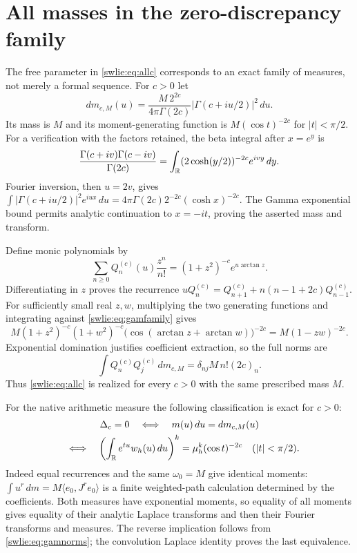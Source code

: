 \section{All masses in the zero-discrepancy family}

The free parameter in \eqref{swlie:eq:allc} corresponds to an exact
family of measures, not merely a formal sequence. For $c>0$ let
\begin{equation}\label{swlie:eq:gamfamily}
 dm_{c,M}(u)=
 \frac{M\,2^{2c}}{4\pi\Gamma(2c)}
       |\Gamma(c+iu/2)|^2\,du .
\end{equation}
Its mass is $M$ and its moment-generating function is
$M(\cos t)^{-2c}$ for $|t|<\pi/2$.
For a verification with the factors retained, the beta integral
after $x=e^y$ is
\[
 \frac{\Gamma(c+iv)\Gamma(c-iv)}{\Gamma(2c)}
  =\int_\mathbb R (2\cosh(y/2))^{-2c}e^{ivy}\,dy .
\]
Fourier inversion, then $u=2v$, gives
$\int|\Gamma(c+iu/2)|^2e^{iux}\,du
 =4\pi\Gamma(2c)2^{-2c}(\cosh x)^{-2c}$.
The Gamma exponential bound permits analytic continuation
to $x=-it$, proving the asserted mass and transform.

Define monic polynomials by
\begin{equation}\label{swlie:eq:genfamily}
 \sum_{n\geq0}Q_n^{(c)}(u)\frac{z^n}{n!}
       =(1+z^2)^{-c}e^{u\arctan z}.
\end{equation}
Differentiating in $z$ proves the recurrence
$uQ_n^{(c)}=Q_{n+1}^{(c)}+n(n-1+2c)Q_{n-1}^{(c)}$.
For sufficiently small real $z,w$, multiplying the two
generating functions and integrating against
\eqref{swlie:eq:gamfamily} gives
\[
 M(1+z^2)^{-c}(1+w^2)^{-c}
       \bigl(\cos(\arctan z+\arctan w)\bigr)^{-2c}
       =M(1-zw)^{-2c}.
\]
Exponential domination justifies coefficient extraction,
so the full norms are
\begin{equation}\label{swlie:eq:gamnorms}
 \int Q_n^{(c)}Q_j^{(c)}\,dm_{c,M}
       =\delta_{nj}M\,n!(2c)_n .
\end{equation}
Thus \eqref{swlie:eq:allc} is realized for every $c>0$ with the
same prescribed mass $M$.

For the native arithmetic measure the following classification
is exact for $c>0$:
\begin{equation}\label{swlie:eq:exacttest}
 \begin{gathered}
 \Delta_c=0
 \quad\Longleftrightarrow\quad m(u)\,du=dm_{c,M}(u)\\
 \quad\Longleftrightarrow\quad
 \left(\int_\mathbb R e^{tu}w_h(u)\,du\right)^k
          =\mu_h^k(\cos t)^{-2c}\quad(|t|<\pi/2).
 \end{gathered}
\end{equation}
Indeed equal recurrences and the same $\omega_0=M$ give
identical moments:
$\int u^r\,dm=M\langle e_0,J^re_0\rangle$ is a finite
weighted-path calculation determined by the coefficients.
Both measures have exponential moments, so equality of
all moments gives equality of their analytic Laplace
transforms and then their Fourier transforms and measures.
The reverse implication follows from \eqref{swlie:eq:gamnorms};
the convolution Laplace identity proves the last equivalence.

